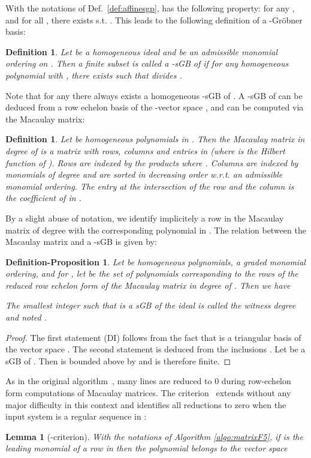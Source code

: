 \documentclass[12pt]{article}
\numberwithin{equation}{section}
\numberwithin{theorem}{section}
\newtheorem{defprop}[theorem]{Definition-Proposition}
\newtheorem{lemma}[theorem]{Lemma}
\newtheorem{definition}[theorem]{Definition}
\begin{document}
With the notations of Def.~\ref{def:affinesgp},  has the following property: for any , and for all , there exists  s.t. . This leads to the following definition of a -Gr\"obner basis:
\begin{definition}
  Let  be a homogeneous ideal and  be an admissible monomial ordering on . Then a finite subset  is called a -sGB of  if for any homogeneous polynomial  with , there exists  such that  divides .
\end{definition}
 Note that for any  there always exists a homogeneous -sGB of . A -sGB of  can be deduced from a row echelon basis of the -vector space , and can be computed via the Macaulay matrix:
\begin{definition}
  Let  be homogeneous polynomials in . Then the \emph{Macaulay matrix} in degree  of  is a matrix with  rows,  columns and entries in  (where  is the Hilbert function of ). Rows are indexed by the products  where . Columns are indexed by monomials of degree  and are sorted in decreasing order w.r.t. an admissible monomial ordering. The entry at the intersection of the row  and the column  is the coefficient of  in .
\end{definition}

By a slight abuse of notation, we identify implicitely a row in the Macaulay matrix of degree  with the corresponding polynomial in . The relation between the Macaulay matrix and a -sGB is given by:
\begin{defprop}\label{defprop:dwit}
Let  be homogeneous polynomials,  a graded monomial ordering, and for , let  be the set of polynomials corresponding to the rows of the reduced row echelon form of the Macaulay matrix in degree  of . Then we have

The smallest integer  such that  is a sGB of the ideal  is called \emph{the witness degree} and noted . 
\end{defprop}

\begin{proof}
The first statement (DI) follows from the fact that  is a triangular basis of the
vector space . The second statement is deduced from
the inclusions . Let  be a sGB of . Then  is bounded above by  and is therefore finite.
\end{proof}

As in the original  algorithm~\cite{Fau02a}, many lines are reduced to 0 during row-echelon form computations of Ma\-cau\-lay matrices. The  criterion~\cite{Fau02a,EF14}\cite[Prop.~6]{BFS13} extends without any major difficulty in this context and identifies all reductions to zero when the input system is a regular sequence in :
\begin{lemma}[-criterion]\label{lem:F5crit}
  With the notations of Algorithm \ref{algo:matrixF5}, 
  if  is the leading monomial of a row in  then the polynomial  belongs to the vector space 
\end{lemma}
\end{document}
